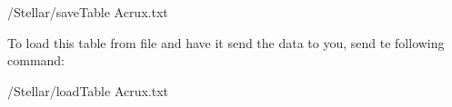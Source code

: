  \begin{syntax}	
 	\medskip
 	/Stellar/saveTable Acrux.txt
 	\medskip
 \end{syntax}

To load this table from file and have it send the data to you, send te following command:
 \begin{syntax}	
	\medskip
	/Stellar/loadTable Acrux.txt
	\medskip
\end{syntax}